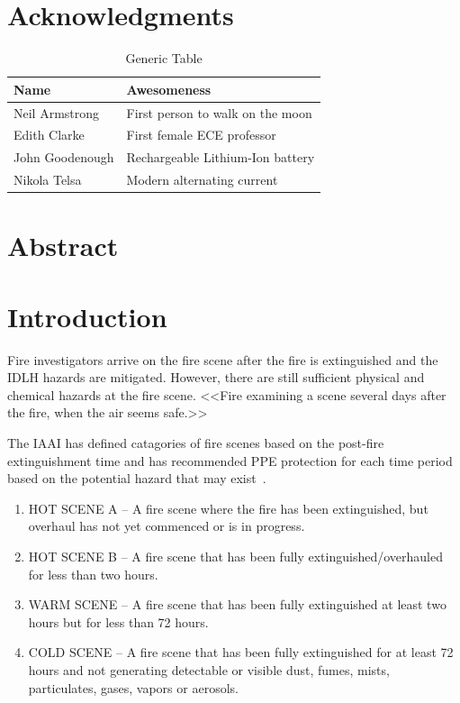\documentclass[12pt,oneside]{book}
\begin{document}
\mainmatter

\chapter*{Acknowledgments}

\begin{table}[!ht]
	\centering
	\caption*{Generic Table}
	\begin{tabular}{ll}
		\toprule[1.5pt]
		Name & Awesomeness \\ 
		\midrule
		Neil Armstrong		 & First person to walk on the moon \\
		Edith Clarke		 & First female ECE professor \\
		John Goodenough		 & Rechargeable Lithium-Ion battery \\
		Nikola Telsa		 & Modern alternating current \\  
		\bottomrule[1.25pt]
	\end{tabular}
\end{table}

\newpage

\chapter*{Abstract}

\newpage
\chapter{Introduction}
\label{chap:intro}
\setcounter{page}{1}

Fire investigators arrive on the fire scene after the fire is extinguished and the IDLH hazards are mitigated.  However, there are still sufficient physical and chemical hazards at the fire scene. 
 <<Fire  examining a scene several days after the fire, when the air seems safe.>>

The IAAI has defined catagories of fire scenes based on the post-fire extinguishment time and has recommended PPE protection for each time period based on the potential hazard that may exist~\cite{IAAI:2020}.   

\begin{enumerate}
\item HOT SCENE A – A fire scene where the fire has been extinguished, but overhaul has not yet commenced or is in progress.

\item HOT SCENE B – A fire scene that has been fully extinguished/overhauled for less than two hours.

\item  WARM SCENE – A fire scene that has been fully extinguished at least two hours but for less than 72 hours. 

\item COLD SCENE – A fire scene that has been fully extinguished for at least 72 hours and not generating detectable or visible dust, fumes, mists, particulates, gases, vapors or aerosols.

\end{enumerate}
\end{document}
